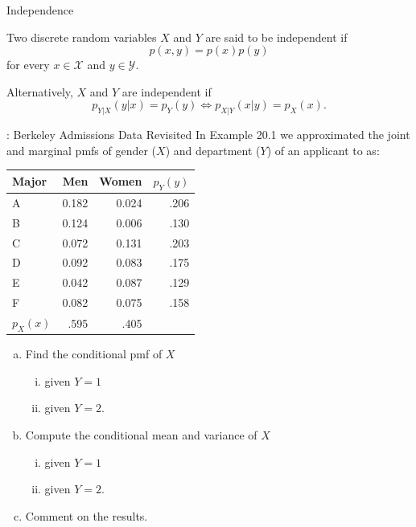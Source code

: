 \begin{frame}

  \begin{block}{Independence}
    
    Two discrete random variables $X$ and $Y$ are said to be independent if
    \[
      p(x,y)=p(x)p(y)
    \]
    for every $x \in \mathcal{X}$ and $y \in \mathcal{Y}$. 
    
    \bigskip
    
    Alternatively, $X$ and $Y$ are independent if
    $$
    p_{Y|X}(y|x)=p_Y(y) \Leftrightarrow p_{X|Y}(x|y)=p_X(x).
    $$
  \end{block}
\end{frame}

\begin{frame}
  \begin{block}{\example: Berkeley Admissions Data Revisited}
    In Example 20.1 we approximated the joint and marginal pmfs of gender ($X$) and department ($Y$) of an applicant to as:
    \begin{center}
      \begin{tabular}{lrr|r}
        \hline
        Major & Men & Women & $p_Y(y)$\\ 
        \hline
        A & 0.182 & 0.024 & .206\\ 
        B & 0.124 & 0.006 & .130\\ 
        C & 0.072 & 0.131 & .203\\ 
        D & 0.092 & 0.083 & .175\\ 
        E & 0.042 & 0.087 & .129\\ 
        F & 0.082 & 0.075 & .158\\ 
        \hline
        $p_X(x)$ & .595 & .405
      \end{tabular}
    \end{center}
  \end{block}
  
\end{frame}

\begin{frame}
  \begin{block}{\examplectd}
    
    \begin{enumerate}[a)]
    \item Find the conditional pmf of $X$
      \begin{enumerate}[i.]
      \item given $Y=1$ 
      \item given $Y=2$.
      \end{enumerate}
    \item Compute the conditional mean and variance of $X$
      \begin{enumerate}[i.]
      \item given $Y=1$
      \item given $Y=2$.
      \end{enumerate}        
    \item Comment on the results.
    \end{enumerate}
  \end{block}
\end{frame}


